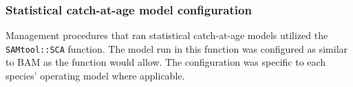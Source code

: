 \documentclass[12pt,english]{article}
\begin{document}
\begin{flushleft}
\begin{spacing}{1.9}

\subsubsection*{Statistical catch-at-age model configuration}

Management procedures that ran statistical catch-at-age models utilized the \texttt{SAMtool::SCA} function. The model run in this function was configured as similar to BAM as the function would allow. The configuration was specific to each species' operating model where applicable.


\end{spacing}
\end{flushleft}
\end{document}

